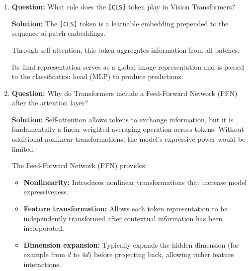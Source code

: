 \documentclass[11pt]{article}
\begin{document}
\begin{enumerate}
\begin{itemize}[nosep]

\item Predict next token
\item Append to sequence
\item Repeat until EOS

\end{itemize}

During training, however, teacher forcing is used, where the decoder receives the ground-truth previous tokens instead of its own predictions.

Autoregressive structure allows the model to learn conditional sequence generation.

\item \textbf{Question:} What role does the \texttt{[CLS]} token play in Vision Transformers?

\textbf{Solution:}
The \texttt{[CLS]} token is a learnable embedding prepended to the sequence of patch embeddings.

Through self-attention, this token aggregates information from all patches.

Its final representation serves as a global image representation and is passed to the classification head (MLP) to produce predictions.

\item \textbf{Question:} Why do Transformers include a Feed-Forward Network (FFN) after the attention layer?

\textbf{Solution:}
Self-attention allows tokens to exchange information, but it is fundamentally a linear weighted averaging operation across tokens. Without additional nonlinear transformations, the model's expressive power would be limited.

The Feed-Forward Network (FFN) provides:

\begin{itemize}[nosep]

\item \textbf{Nonlinearity:} Introduces nonlinear transformations that increase model expressiveness.

\item \textbf{Feature transformation:} Allows each token representation to be independently transformed after contextual information has been incorporated.

\item \textbf{Dimension expansion:} Typically expands the hidden dimension (for example from $d$ to $4d$) before projecting back, allowing richer feature interactions.


\end{itemize}
\end{enumerate}
\end{document}
